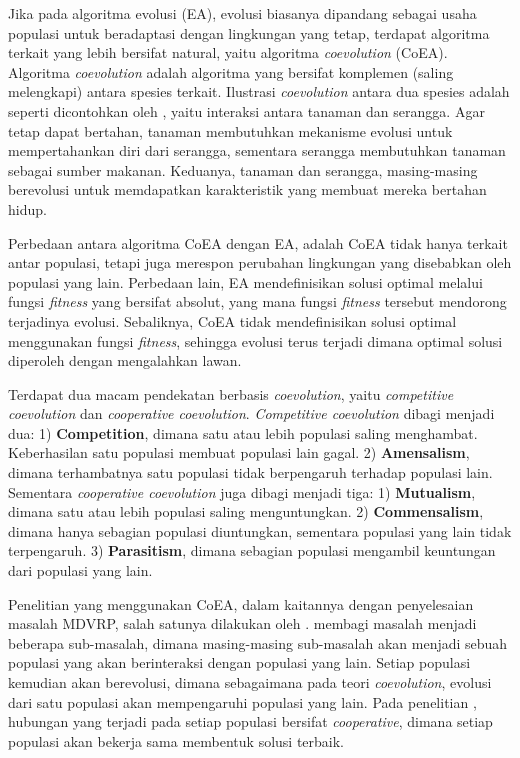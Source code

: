 Jika pada algoritma evolusi (EA), evolusi biasanya dipandang sebagai usaha populasi untuk beradaptasi dengan lingkungan yang tetap, terdapat algoritma terkait yang lebih bersifat natural, yaitu algoritma \textit{coevolution} (CoEA). Algoritma \textit{coevolution} adalah algoritma yang bersifat komplemen (saling melengkapi) antara spesies terkait. Ilustrasi \textit{coevolution} antara dua spesies adalah seperti dicontohkan oleh \citep{holland_echo:_1990}, yaitu interaksi antara tanaman dan serangga. Agar tetap dapat bertahan, tanaman membutuhkan mekanisme evolusi untuk mempertahankan diri dari serangga, sementara serangga membutuhkan tanaman sebagai sumber makanan. Keduanya, tanaman dan serangga, masing-masing berevolusi untuk memdapatkan karakteristik yang membuat mereka bertahan hidup.


Perbedaan antara algoritma CoEA dengan EA, adalah CoEA tidak hanya terkait antar populasi, tetapi juga merespon perubahan lingkungan yang disebabkan oleh populasi yang lain. Perbedaan lain, EA mendefinisikan solusi optimal melalui fungsi \textit{fitness} yang bersifat absolut, yang mana fungsi \textit{fitness} tersebut mendorong terjadinya evolusi. Sebaliknya, CoEA tidak mendefinisikan solusi optimal menggunakan fungsi \textit{fitness}, sehingga evolusi terus terjadi dimana optimal solusi diperoleh dengan mengalahkan lawan.


Terdapat dua macam pendekatan berbasis \textit{coevolution}, yaitu \textit{competitive coevolution} dan \textit{cooperative coevolution}. \textit{Competitive coevolution} dibagi menjadi dua: 1) \textbf{Competition}, dimana satu atau lebih populasi saling menghambat. Keberhasilan satu populasi membuat populasi lain gagal. 2) \textbf{Amensalism}, dimana terhambatnya satu populasi tidak berpengaruh terhadap populasi lain. Sementara  \textit{cooperative coevolution} juga dibagi menjadi tiga: 1) \textbf{Mutualism}, dimana satu atau lebih populasi saling menguntungkan. 2) \textbf{Commensalism}, dimana hanya sebagian populasi diuntungkan, sementara populasi yang lain tidak terpengaruh. 3) \textbf{Parasitism}, dimana sebagian populasi mengambil keuntungan dari populasi yang lain.


Penelitian yang menggunakan CoEA, dalam kaitannya dengan penyelesaian masalah MDVRP, salah satunya dilakukan oleh \citep{de_oliveira_cooperative_2016}. \citep{de_oliveira_cooperative_2016} membagi masalah menjadi beberapa sub-masalah, dimana masing-masing sub-masalah akan menjadi sebuah populasi yang akan berinteraksi dengan populasi yang lain. Setiap populasi kemudian akan berevolusi, dimana sebagaimana pada teori \textit{coevolution}, evolusi dari satu populasi akan mempengaruhi populasi yang lain. Pada penelitian \citep{de_oliveira_cooperative_2016}, hubungan yang terjadi pada setiap populasi bersifat \textit{cooperative}, dimana setiap populasi akan bekerja sama membentuk solusi terbaik.


